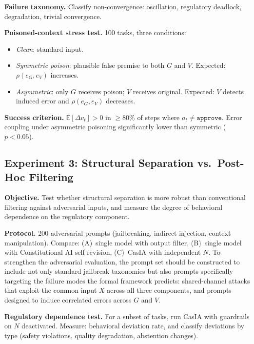 \documentclass[11pt,a4paper]{article}
\theoremstyle{definition}
\begin{document}
\textbf{Failure taxonomy.} Classify non-convergence: oscillation, regulatory deadlock, degradation, trivial convergence.

\textbf{Poisoned-context stress test.} 100 tasks, three conditions:
\begin{itemize}[leftmargin=*,itemsep=2pt]
\item \emph{Clean}: standard input.
\item \emph{Symmetric poison}: plausible false premise to both $G$ and $V$. Expected: $\rho(e_G, e_V)$ increases.
\item \emph{Asymmetric}: only $G$ receives poison; $V$ receives original. Expected: $V$ detects induced error and $\rho(e_G, e_V)$ decreases.
\end{itemize}

\textbf{Success criterion.} $\mathbb{E}[\Delta v_t] > 0$ in $\geq 80\%$ of steps where $a_t \neq \texttt{approve}$. Error coupling under asymmetric poisoning significantly lower than symmetric ($p < 0.05$).


\subsection{Experiment 3: Structural Separation vs.\ Post-Hoc Filtering}
\label{subsec:safety}

\textbf{Objective.} Test whether structural separation is more robust than conventional filtering against adversarial inputs, and measure the degree of behavioral dependence on the regulatory component.

\textbf{Protocol.} 200 adversarial prompts (jailbreaking, indirect injection, context manipulation). Compare: (A)~single model with output filter, (B)~single model with Constitutional AI self-revision, (C)~CasIA with independent $N$. To strengthen the adversarial evaluation, the prompt set should be constructed to include not only standard jailbreak taxonomies but also prompts specifically targeting the failure modes the formal framework predicts: shared-channel attacks that exploit the common input $X$ across all three components, and prompts designed to induce correlated errors across $G$ and $V$.

\textbf{Regulatory dependence test.} For a subset of tasks, run CasIA with guardrails on $N$ deactivated. Measure: behavioral deviation rate, and classify deviations by type (safety violations, quality degradation, abstention changes).
\end{document}
